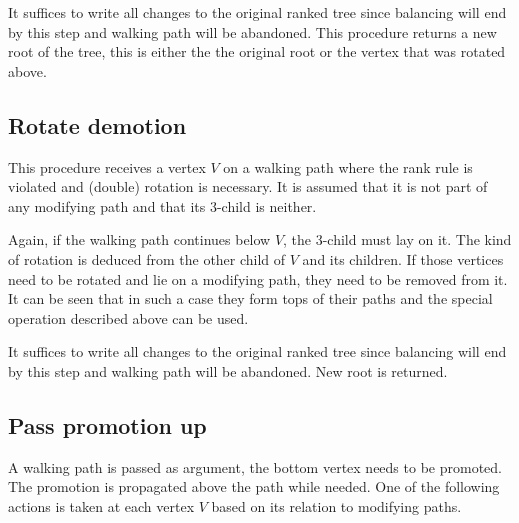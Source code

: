 It suffices to write all changes to the original ranked tree since balancing will end by this step and walking path will be abandoned. 
This procedure returns a new root of the tree, this is either the the original root or the vertex that was rotated above.

\subsection{Rotate demotion}

This procedure receives a vertex $V$ on a walking path where the rank rule is violated and (double) rotation is necessary. It is assumed that it is not part of any modifying path and that its $3$-child is neither. 

Again, if the walking path continues below $V$, the 3-child must lay on it. The kind of rotation is deduced from the other child of $V$ and its children. If those vertices need to be rotated and lie on a modifying path, they need to be removed from it. It can be seen that in such a case they form tops of their paths and the special operation described above can be used.

It suffices to write all changes to the original ranked tree since balancing will end by this step and walking path will be abandoned. New root is returned.

\subsection{Pass promotion up}

A walking path is passed as argument, the bottom vertex needs to be promoted. The promotion is propagated above the path while needed. One of the following actions is taken at each vertex $V$ based on its relation to modifying paths.

